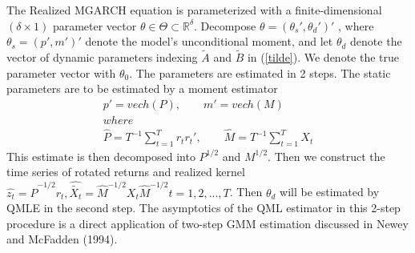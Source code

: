 \documentclass[titlepage,11pt]{article}
\begin{document}
The Realized MGARCH equation is parameterized with a finite-dimensional $(\delta \times 1)$ parameter vector $\theta\in \Theta\subset \mathbb{R}^\delta $. Decompose $\theta = (\theta_s',\theta_d')'$ , where $\theta_s =(p', m')' $  denote the model's unconditional moment, and let $\theta_d$ denote the vector of dynamic parameters indexing $\tilde{A}$ and $\tilde{B}$ in (\ref{tilde}). We denote the true parameter vector with $\theta_0$. 
The parameters are estimated in 2 steps. The static parameters are to be estimated by a moment estimator
\begin{align*}
p' = vech (P) , \qquad m' = vech(M)\\   
where \\
\hat{P} = T^{-1} \sum_{t=1}^{T} r_t r_t' , \qquad 
\hat{M} = T^{-1} \sum_{t=1}^{T} X_t
\end{align*}
This estimate is then decomposed into $P^{1/2}$ and $M^{1/2}$. Then we construct the time series of rotated returns and realized kernel $\hat{z_t} = \hat{P}^{-1/2}r_t,\hat{\tilde{X_t}} = \hat{M}^{-1/2}X_t\hat{M}^{-1/2} t=1,2,...,T$. Then $\theta_d$ will be estimated by QMLE in the second step. The asymptotics of the QML estimator in this 2-step procedure is a direct application of two-step GMM estimation discussed in Newey and McFadden (1994).
\end{document}
